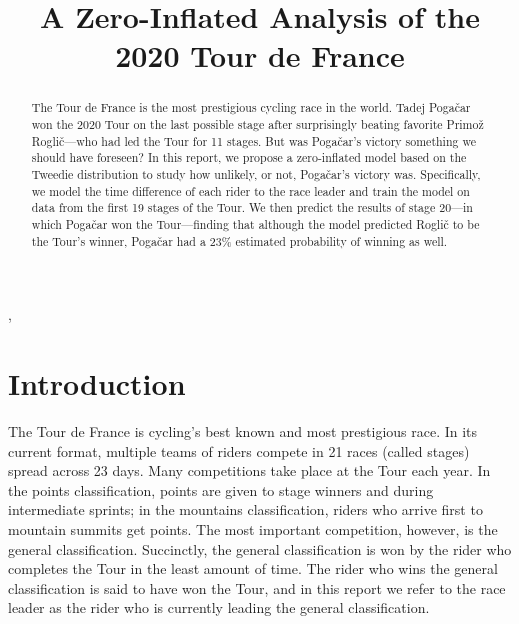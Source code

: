 \documentclass[aos,preprint]{imsart}
\begin{document}
\begin{frontmatter}
\title{A Zero-Inflated Analysis of the 2020 Tour de France}

\begin{aug}
\author{ },

\runauthor{}


\address{Department of Statistics\\
University of British Columbia\\
Vancouver, BC, Canada V6T 1Z4\\
E-mail: \normalfont
\href{mailto:gian.diluvi@stat.ubc.ca}{gian.diluvi@stat.ubc.ca}}

\end{aug}

\begin{abstract}
The Tour de France is the most prestigious cycling race in the world. Tadej Pogačar won the 2020 Tour on the last possible stage after surprisingly beating favorite Primož Roglič---who had led the Tour for 11 stages. But was Pogačar's victory something we should have foreseen? In this report, we propose a zero-inflated model based on the Tweedie distribution to study how unlikely, or not, Pogačar's victory was. Specifically, we model the time difference of each rider to the race leader and train the model on data from the first 19 stages of the Tour. We then predict the results of stage 20---in which Pogačar won the Tour---finding that although the model predicted Roglič to be the Tour's winner, Pogačar had a 23\% estimated probability of winning as well.
\end{abstract}



\end{frontmatter}

\section{Introduction} \label{sec:intro}


The Tour de France is cycling's best known and most prestigious race. In its current format, multiple teams of riders compete in 21 races (called stages) spread across 23 days. Many competitions take place at the Tour each year. In the points classification, points are given to stage winners and during intermediate sprints; in the mountains classification, riders who arrive first to mountain summits get points. The most important competition, however, is the general classification. Succinctly, the general classification is won by the rider who completes the Tour in the least amount of time. The rider who wins the general classification is said to have won the Tour, and in this report we refer to the race leader as the rider who is currently leading the general classification. \\
\end{document}
